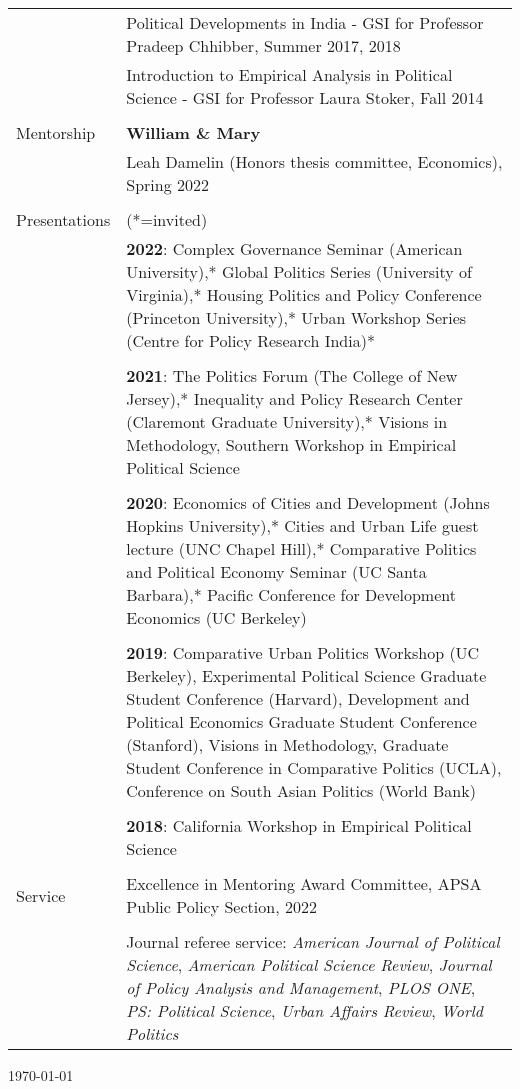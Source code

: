 \documentclass[letterpaper, 11pt]{article}
\begin{document}
\begin{longtable}{p{1in}p{5.5in}}
& Political Developments in India - GSI for Professor Pradeep Chhibber, Summer 2017, 2018\\

& Introduction to Empirical Analysis in Political Science - GSI for Professor Laura Stoker, Fall 2014\\
&\\


{{Mentorship}} & \textbf{William \& Mary} \\
&Leah Damelin (Honors thesis committee, Economics), Spring 2022 \\

&\\




{{Presentations}} & (*=invited) \\
& \textbf{2022}: Complex Governance Seminar (American University),* Global Politics Series (University of Virginia),* Housing Politics and Policy Conference (Princeton University),* Urban Workshop Series (Centre for Policy Research India)*\\
&\\

&\textbf{2021}: The Politics Forum (The College of New Jersey),* Inequality and Policy Research Center (Claremont Graduate University),*  Visions in Methodology, Southern Workshop in Empirical Political Science \\
 
 &\\
 &\textbf{2020}: Economics of Cities and Development (Johns Hopkins University),* Cities and Urban Life guest lecture (UNC Chapel Hill),* Comparative Politics and Political Economy Seminar (UC Santa Barbara),* Pacific Conference for Development Economics (UC Berkeley) \\
 &\\


 &\textbf{2019}: Comparative Urban Politics Workshop (UC Berkeley), Experimental Political Science Graduate Student Conference (Harvard), Development and Political Economics Graduate Student Conference (Stanford), Visions in Methodology, Graduate Student Conference in Comparative Politics (UCLA), Conference on South Asian Politics (World Bank)\\
 
 &\\
 &\textbf{2018}: California Workshop in Empirical Political Science
\\
 &\\
 
 

\nohyphens{{Service}}&Excellence in Mentoring Award Committee, APSA Public Policy Section, 2022 \\

&\\

&Journal referee service: \textit{American Journal of Political Science}, \textit{American Political Science Review}, \textit{Journal of Policy Analysis and Management}, \textit{PLOS ONE}, \textit{PS: Political Science}, \textit{Urban Affairs Review}, \textit{World Politics}\\ 

\end{longtable}
\vspace*{\fill}
\flushright \monthyeardate\today 
\end{document}

